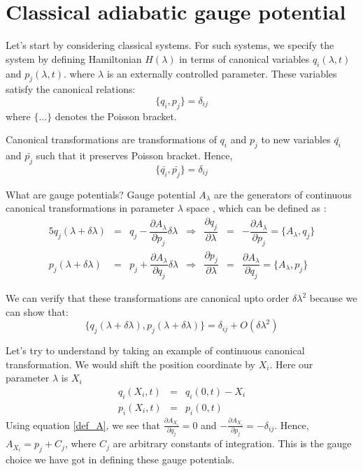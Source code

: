 \documentclass[11pt,a4paper]{article}
\begin{document}
\section{Classical adiabatic gauge potential}
Let's start by considering classical systems. For such systems, we specify the system by defining Hamiltonian $H (\lambda)$ in terms of canonical variables $q_i (\lambda,t)$ and $p_j (\lambda,t)$. where $\lambda$ is an externally controlled parameter. These variables satisfy the canonical relations:
\begin{equation}
\{q_i,p_j \}=\delta_{ij} 
\end{equation}
where $\{\ldots \}$ denotes the Poisson bracket.

Canonical transformations are transformations of $q_i$ and $p_j$ to new variables $\bar{q_i}$ and $\bar{p_j}$ such that it preserves Poisson bracket. Hence, 
\begin{equation}
\{\bar{q_i},\bar{p_j} \}=\delta_{ij} 
\end{equation}

What are gauge potentials? Gauge potential $A_{\lambda}$  are the generators of continuous canonical transformations in parameter $\lambda$ space , which can be defined as :
\begin{alignat}{5}
q_j(\lambda + \delta \lambda) & =& q_j - \dfrac{\partial A_{\lambda}}{\partial p_j} \delta \lambda &\Rightarrow & \dfrac{\partial q_j}{\partial \lambda} &=& -\dfrac{\partial A_{\lambda}}{\partial p_j} = \{A_{\lambda},q_j \} \\
p_j(\lambda + \delta \lambda) & =& p_j + \dfrac{\partial A_{\lambda}}{\partial q_j} \delta \lambda & \Rightarrow & \dfrac{\partial p_j}{\partial \lambda} &=& \dfrac{\partial A_{\lambda}}{\partial q_j}=\{ A_{\lambda},p_j \}
\label{def_A}
\end{alignat}

We can verify that these transformations are canonical upto order $\delta \lambda ^2$ because we can show that:
\begin{equation}
\{q_j(\lambda + \delta \lambda), p_j(\lambda + \delta \lambda)\} = \delta_{ij} + O(\delta \lambda ^2)
\end{equation}

Let's try to understand by taking an example of continuous canonical transformation. We would shift the position coordinate by $X_i$. Here our parameter $\lambda$ is $X_i$
\begin{eqnarray}
 q_i(X_i,t) &=& q_i(0,t) - X_i \\
p_i(X_i,t)&=& p_i(0,t)
\end{eqnarray}
Using equation \ref{def_A}, we see that $\frac{\partial A_{X_i}}{\partial q_j}=0$ and $-\frac{\partial A_{X_i}}{\partial p_j}=-\delta_{ij}$. Hence, $A_{X_i}=p_j + C_j$, where $C_j$ are arbitrary constants of integration. This is the gauge choice we have got in defining these gauge potentials. 
\end{document}

